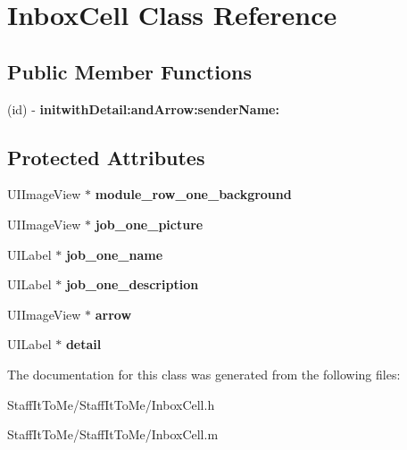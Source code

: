 \hypertarget{interface_inbox_cell}{
\section{\-Inbox\-Cell \-Class \-Reference}
\label{interface_inbox_cell}
}
\subsection*{\-Public \-Member \-Functions}
\begin{DoxyCompactItemize}
\item 
\hypertarget{interface_inbox_cell_ad4fe0ce2e99a97eb0274cd462a570aa9}{
(id) -\/ {\bfseries initwith\-Detail\-:and\-Arrow\-:sender\-Name\-:}}
\label{interface_inbox_cell_ad4fe0ce2e99a97eb0274cd462a570aa9}

\end{DoxyCompactItemize}
\subsection*{\-Protected \-Attributes}
\begin{DoxyCompactItemize}
\item 
\hypertarget{interface_inbox_cell_a405eb7a1f13527611698ebcfffd7a000}{
\-U\-I\-Image\-View $\ast$ {\bfseries module\-\_\-row\-\_\-one\-\_\-background}}
\label{interface_inbox_cell_a405eb7a1f13527611698ebcfffd7a000}

\item 
\hypertarget{interface_inbox_cell_aaf5562c36e6dfa43c3de193cb5c2c992}{
\-U\-I\-Image\-View $\ast$ {\bfseries job\-\_\-one\-\_\-picture}}
\label{interface_inbox_cell_aaf5562c36e6dfa43c3de193cb5c2c992}

\item 
\hypertarget{interface_inbox_cell_ac89750472bf673119efdf3a14e9ed903}{
\-U\-I\-Label $\ast$ {\bfseries job\-\_\-one\-\_\-name}}
\label{interface_inbox_cell_ac89750472bf673119efdf3a14e9ed903}

\item 
\hypertarget{interface_inbox_cell_a1755403001255433ab973affb32926f3}{
\-U\-I\-Label $\ast$ {\bfseries job\-\_\-one\-\_\-description}}
\label{interface_inbox_cell_a1755403001255433ab973affb32926f3}

\item 
\hypertarget{interface_inbox_cell_a3c9377f20b83a6d17e5c602905469ce1}{
\-U\-I\-Image\-View $\ast$ {\bfseries arrow}}
\label{interface_inbox_cell_a3c9377f20b83a6d17e5c602905469ce1}

\item 
\hypertarget{interface_inbox_cell_a09903f57e76d149981d0f18795ec3685}{
\-U\-I\-Label $\ast$ {\bfseries detail}}
\label{interface_inbox_cell_a09903f57e76d149981d0f18795ec3685}

\end{DoxyCompactItemize}


\-The documentation for this class was generated from the following files\-:\begin{DoxyCompactItemize}
\item 
\-Staff\-It\-To\-Me/\-Staff\-It\-To\-Me/\-Inbox\-Cell.\-h\item 
\-Staff\-It\-To\-Me/\-Staff\-It\-To\-Me/\-Inbox\-Cell.\-m\end{DoxyCompactItemize}
